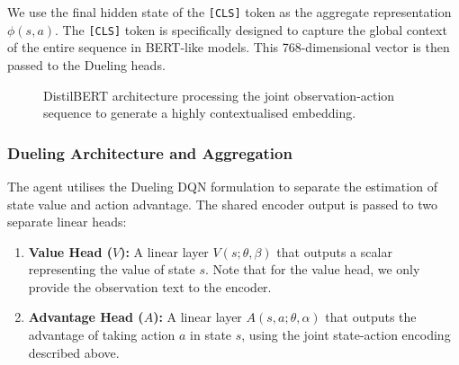 \documentclass[11pt,a4paper]{article}
\begin{document}
We use the final hidden state of the \texttt{[CLS]} token as the aggregate representation $\phi(s, a)$. The \texttt{[CLS]} token is specifically designed to capture the global context of the entire sequence in BERT-like models. This 768-dimensional vector is then passed to the Dueling heads.

\begin{figure}[H]
\centering
{}
\caption{DistilBERT architecture processing the joint observation-action sequence to generate a highly contextualised embedding.}
\end{figure}


\subsubsection{Dueling Architecture and Aggregation}
The agent utilises the Dueling DQN formulation to separate the estimation of state value and action advantage. The shared encoder output is passed to two separate linear heads:
\begin{enumerate}
    \item \textbf{Value Head ($V$):} A linear layer $V(s; \theta, \beta)$ that outputs a scalar representing the value of state $s$. Note that for the value head, we only provide the observation text to the encoder.
    \item \textbf{Advantage Head ($A$):} A linear layer $A(s, a; \theta, \alpha)$ that outputs the advantage of taking action $a$ in state $s$, using the joint state-action encoding described above.
\end{enumerate}
\end{document}

